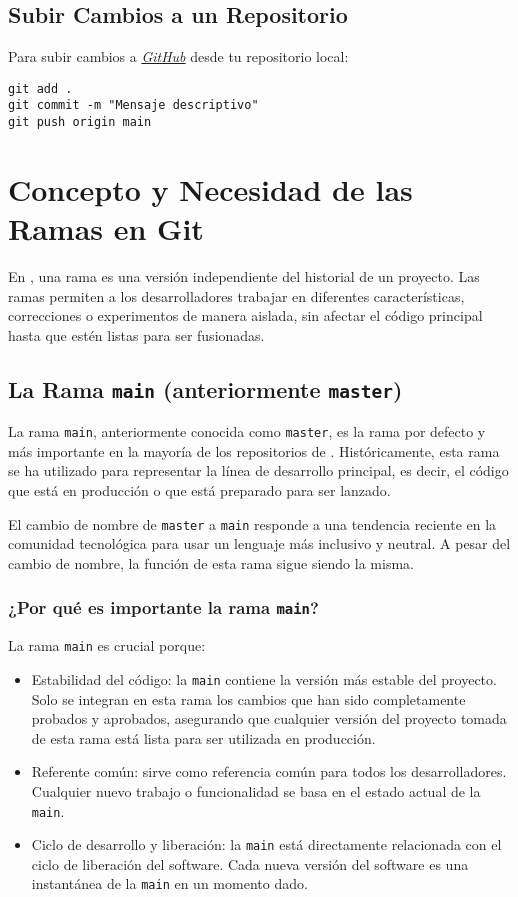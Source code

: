 \documentclass{template/uem_theme}
\begin{document}
\subsection{Subir Cambios a un Repositorio}
Para subir cambios a \href{https://github.com}{\textit{GitHub}} desde tu repositorio local:
\begin{verbatim}
git add .
git commit -m "Mensaje descriptivo"
git push origin main
\end{verbatim}

\section{Concepto y Necesidad de las Ramas en Git}

En \git, una rama es una versión independiente del historial de un proyecto. Las ramas permiten a los desarrolladores trabajar en diferentes características, correcciones o experimentos de manera aislada, sin afectar el código principal hasta que estén listas para ser fusionadas. 

\subsection{La Rama \texttt{main} (anteriormente \texttt{master})}

La rama \texttt{main}, anteriormente conocida como \texttt{master}, es la rama por defecto y más importante en la mayoría de los repositorios de \git. Históricamente, esta rama se ha utilizado para representar la línea de desarrollo principal, es decir, el código que está en producción o que está preparado para ser lanzado.

El cambio de nombre de \texttt{master} a \texttt{main} responde a una tendencia reciente en la comunidad tecnológica para usar un lenguaje más inclusivo y neutral. A pesar del cambio de nombre, la función de esta rama sigue siendo la misma.

\subsubsection{¿Por qué es importante la rama \texttt{main}?}

La rama \texttt{main} es crucial porque:

\begin{itemize}
    \item Estabilidad del código: la \texttt{main} contiene la versión más estable del proyecto. Solo se integran en esta rama los cambios que han sido completamente probados y aprobados, asegurando que cualquier versión del proyecto tomada de esta rama está lista para ser utilizada en producción.
    \item Referente común: sirve como referencia común para todos los desarrolladores. Cualquier nuevo trabajo o funcionalidad se basa en el estado actual de la \texttt{main}.
    \item Ciclo de desarrollo y liberación: la \texttt{main} está directamente relacionada con el ciclo de liberación del software. Cada nueva versión del software es una instantánea de la \texttt{main} en un momento dado.
\end{itemize}
\end{document}
